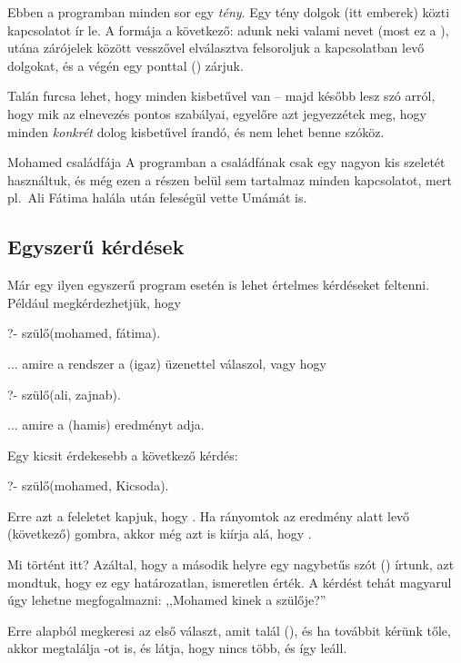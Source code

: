Ebben a programban minden sor egy \emph{tény}. Egy
tény dolgok (itt emberek) közti kapcsolatot ír
le. A formája a következő: adunk neki valami nevet
(most ez a ), utána zárójelek között
vesszővel elválasztva felsoroljuk a kapcsolatban
levő dolgokat, és a végén egy ponttal ()
zárjuk.

Talán furcsa lehet, hogy minden kisbetűvel van --
majd később lesz szó arról, hogy mik az elnevezés
pontos szabályai, egyelőre azt jegyezzétek meg,
hogy minden \emph{konkrét} dolog kisbetűvel
írandó, és nem lehet benne szóköz.

\begin{infobox}{.75}{Mohamed családfája}
A programban a családfának csak egy nagyon kis
szeletét használtuk, és még ezen a részen belül
sem tartalmaz minden kapcsolatot, mert pl.~Ali
Fátima halála után feleségül vette Umámát is.
\end{infobox}

\subsection*{Egyszerű kérdések}

Már egy ilyen egyszerű program esetén is lehet
értelmes kérdéseket feltenni. Például
megkérdezhetjük, hogy
\begin{query}
?- szülő(mohamed, fátima).
\end{query}
... amire a rendszer a  (igaz) üzenettel
válaszol, vagy hogy
\begin{query}
?- szülő(ali, zajnab).
\end{query}
... amire a  (hamis) eredményt adja.

Egy kicsit érdekesebb a következő kérdés:
\begin{query}
?- szülő(mohamed, Kicsoda).
\end{query}
Erre azt a feleletet kapjuk, hogy . Ha rányomtok az eredmény alatt levő  (következő) gombra, akkor még azt is kiírja alá, hogy .

Mi történt itt? Azáltal, hogy a második helyre egy nagybetűs szót () írtunk, azt mondtuk, hogy ez egy határozatlan, ismeretlen érték. A kérdést tehát magyarul úgy lehetne megfogalmazni: ,,Mohamed kinek a szülője?''

Erre alapból megkeresi az első választ, amit talál (), és ha továbbit kérünk tőle, akkor megtalálja -ot is, és látja, hogy nincs több, és így leáll.

